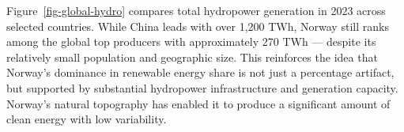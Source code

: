 \documentclass[
  letterpaper,
  DIV=11,
  numbers=noendperiod]{scrartcl}
\begin{document}
Figure~\ref{fig-global-hydro} compares total hydropower generation in
2023 across selected countries. While China leads with over 1,200 TWh,
Norway still ranks among the global top producers with approximately 270
TWh --- despite its relatively small population and geographic size.
This reinforces the idea that Norway's dominance in renewable energy
share is not just a percentage artifact, but supported by substantial
hydropower infrastructure and generation capacity. Norway's natural
topography has enabled it to produce a significant amount of clean
energy with low variability.
\end{document}

